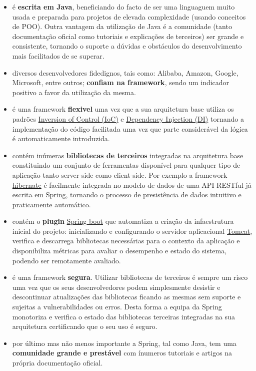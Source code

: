 \begin{itemize}
    
    \item é \textbf{escrita em Java}, beneficiando do facto de ser uma linguaguem muito usada e preparada para projetos de elevada complexidade (usando conceitos de POO). Outra vantagem da utilização de Java é a comunidade (tanto documentação oficial como tutoriais e explicações de terceiros) ser grande e consistente, tornando o suporte a dúvidas e obstáculos do desenvolvimento mais facilitados de se superar.
    
    \item diversos desenvolvedores fidedignos, tais como: Alibaba, Amazon, Google, Microsoft, entre outros; \textbf{confiam na framework}, sendo um indicador positivo a favor da utilização da mesma. 
    
    \item é uma framework \textbf{flexivel} uma vez que a sua arquitetura base utiliza os padrões \href{https://en.wikipedia.org/wiki/Inversion_of_control}{Inversion of Control (IoC)} e \href{https://en.wikipedia.org/wiki/Dependency_injection}{Dependency Injection (DI)} tornando a implementação do código facilitada uma vez que parte considerável da lógica é automaticamente introduzida.
    
    \item contém inúmeras \textbf{bibliotecas de terceiros} integradas na arquitetura base constituindo um conjunto de ferramentas disponível para qualquer tipo de aplicação tanto server-side como client-side. Por exemplo a framework \href{https://hibernate.org/}{hibernate} é facilmente integrada no modelo de dados de uma API RESTful já escrita em Spring, tornando o processo de presistência de dados intuitivo e praticamente automático.  
    
    \item contém o \textbf{plugin} \href{https://spring.io/projects/spring-boot}{Spring boot} que automatiza a criação da infaestrutura inicial do projeto: inicializando e configurando o servidor aplicacional \href{http://tomcat.apache.org/Tomcat}{Tomcat}, verifica e descarrega bibliotecas necessárias para o contexto da aplicação e disponibiliza métricas para avaliar o desempenho e estado do sistema, podendo ser remotamente avaliado.
    
    \item é uma framework \textbf{segura}. Utilizar bibliotecas de terceiros é sempre um risco uma vez que os seus desenvolvedores podem simplesmente desistir e descontinuar atualizações das bibliotecas ficando as mesmas sem suporte e sujeitas a vulnerabilidades ou erros. Desta forma a equipa da Spring monotoriza e verifica o estado das bibliotecas terceiras integradas na sua arquitetura certificando que o seu uso é seguro.
    
    \item por último mas não menos importante a Spring, tal como Java, tem uma \textbf{comunidade grande e prestável} com ínumeros tutoriais e artigos na própria documentação oficial.
\end{itemize}


